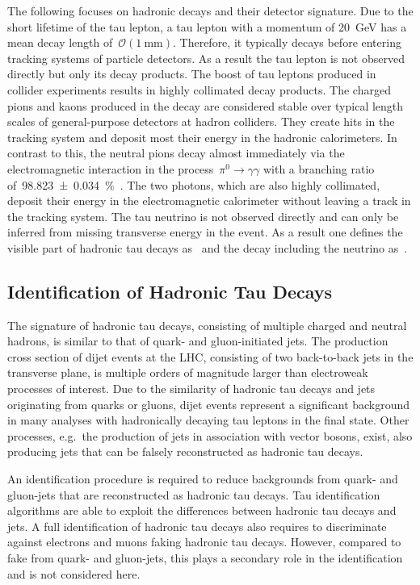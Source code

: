 The following focuses on hadronic decays and their detector signature. Due to
the short lifetime of the tau lepton, a tau lepton with a momentum of
\SI{20}{\GeV} has a mean decay length of~$\mathcal{O}(\SI{1}{\milli\metre})$.
Therefore, it typically decays before entering tracking systems of particle
detectors. As a result the tau lepton is not observed directly but only its
decay products. The boost of tau leptons produced in collider experiments
results in highly collimated decay products. The charged pions and kaons
produced in the decay are considered stable over typical length scales of
general-purpose detectors at hadron colliders. They create hits in the tracking
system and deposit most their energy in the hadronic calorimeters. In contrast
to this, the neutral pions decay almost immediately via the electromagnetic
interaction in the process~\mbox{$\pi^0 \to \gamma\gamma$} with a branching
ratio of~\SI{98.823 +- 0.034}{\percent}~\cite{pdg}. The two photons, which are
also highly collimated, deposit their energy in the electromagnetic calorimeter
without leaving a track in the tracking system. The tau neutrino is not observed
directly and can only be inferred from missing transverse energy in the event.
As a result one defines the visible part of hadronic tau decays as~\tauhadvis
and the decay including the neutrino as~\tauhad.

\subsection{Identification of Hadronic Tau Decays}
\label{sec:features_tau_decay}

The signature of hadronic tau decays, consisting of multiple charged and neutral
hadrons, is similar to that of quark- and gluon-initiated jets. The production
cross section of dijet events at the LHC, consisting of two back-to-back jets in
the transverse plane, is multiple orders of magnitude larger than electroweak
processes of interest. Due to the similarity of hadronic tau decays and jets
originating from quarks or gluons, dijet events represent a significant
background in many analyses with hadronically decaying tau leptons in the final
state. Other processes, e.g.\ the production of jets in association with vector
bosons, exist, also producing jets that can be falsely reconstructed as hadronic
tau decays.

An identification procedure is required to reduce backgrounds from quark- and
gluon-jets that are reconstructed as hadronic tau decays. Tau identification
algorithms are able to exploit the differences between hadronic tau decays and
jets. A full identification of hadronic tau decays also requires to discriminate
against electrons and muons faking hadronic tau decays. However, compared to
fake \tauhad from quark- and gluon-jets, this plays a secondary role in the
identification and is not considered here.

